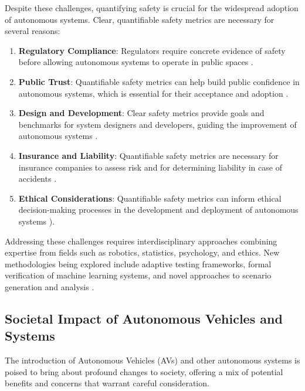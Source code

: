 Despite these challenges, quantifying safety is crucial for the widespread adoption of autonomous systems. Clear, quantifiable safety metrics are necessary for several reasons:

\begin{enumerate}
    \item \textbf{Regulatory Compliance}: Regulators require concrete evidence of safety before allowing autonomous systems to operate in public spaces \cite{Cummings2021}.
    
    \item \textbf{Public Trust}: Quantifiable safety metrics can help build public confidence in autonomous systems, which is essential for their acceptance and adoption \cite{Choi2020}.
    
    \item \textbf{Design and Development}: Clear safety metrics provide goals and benchmarks for system designers and developers, guiding the improvement of autonomous systems \cite{Shalev2017}.
    
    \item \textbf{Insurance and Liability}: Quantifiable safety metrics are necessary for insurance companies to assess risk and for determining liability in case of accidents \cite{Schellekens2015}.
    
    \item \textbf{Ethical Considerations}: Quantifiable safety metrics can inform ethical decision-making processes in the development and deployment of autonomous systems \cite{Awad2018}).
\end{enumerate}

Addressing these challenges requires interdisciplinary approaches combining expertise from fields such as robotics, statistics, psychology, and ethics. New methodologies being explored include adaptive testing frameworks, formal verification of machine learning systems, and novel approaches to scenario generation and analysis \cite{Seshia2016}.

\subsection{Societal Impact of Autonomous Vehicles and Systems}

The introduction of Autonomous Vehicles (AVs) and other autonomous systems is poised to bring about profound changes to society, offering a mix of potential benefits and concerns that warrant careful consideration.

